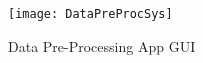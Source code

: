 
\begin{figure}[H]
\centering
\texttt{[image: DataPreProcSys]}
\caption{Data Pre-Processing App GUI}
\label{figApp5_1} %
\end{figure}